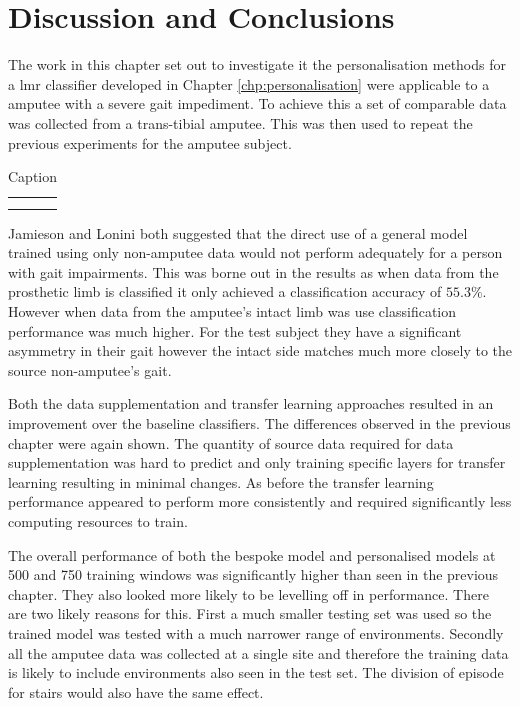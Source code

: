 \section{Discussion and Conclusions}
\label{sec:amputee-discussion}
The work in this chapter set out to investigate it the personalisation methods for a \acrshort{lmr} classifier developed in Chapter \ref{chp:personalisation} were applicable to a amputee with a severe gait impediment. To achieve this a set of comparable data was collected from a trans-tibial amputee. This was then used to repeat the previous experiments for the amputee subject.

\begin{table}[]
    \centering
    \begin{tabular}{c|c}
         &  \\
         & 
    \end{tabular}
    \caption{Caption}
    \label{tab:my_label}
\end{table}

Jamieson and Lonini both suggested that the direct use of a general model trained using only non-amputee data would not perform adequately for a person with gait impairments\cite{Lonini2016, Jamieson2021}. This was borne out in the results as when data from the prosthetic limb is classified it only achieved a classification accuracy of $55.3\%$. However when data from the amputee's intact limb was use classification performance was much higher. For the test subject they have a significant asymmetry in their gait however the intact side matches much more closely to the source non-amputee's gait.

Both the data supplementation and transfer learning approaches resulted in an improvement over the baseline classifiers. The differences observed in the previous chapter were again shown. The quantity of source data required for data supplementation was hard to predict and only training specific layers for transfer learning resulting in minimal changes. As before the transfer learning performance appeared to perform more consistently and required significantly less computing resources to train.

The overall performance of both the bespoke model and personalised models at 500 and 750 training windows was significantly higher than seen in the previous chapter. They also looked more likely to be levelling off in performance. There are two likely reasons for this. First a much smaller testing set was used so the trained model was tested with a much narrower range of environments. Secondly all the amputee data was collected at a single site and therefore the training data is likely to include environments also seen in the test set. The division of episode for stairs would also have the same effect. 

